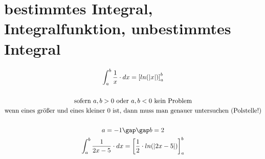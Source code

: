 \section{bestimmtes Integral, Integralfunktion, unbestimmtes Integral}
\begin{gather*}
  \int_a^b \frac{1}{x} \cdot dx = \left[ln(|x|)\right]_a^b \\\\
  \text{sofern } a, b > 0 \text{ oder } a, b < 0 \text{ kein Problem} \\
  \text{wenn eines größer und eines kleiner $0$ ist, dann muss man genauer untersuchen (Polstelle!)} \\\\
  a = -1 \gap\gap b = 2 \\
  \int_a^b \frac{1}{2x - 5} \cdot dx = \left[\frac{1}{2} \cdot ln(|2x - 5|)\right]_a^b
\end{gather*}
